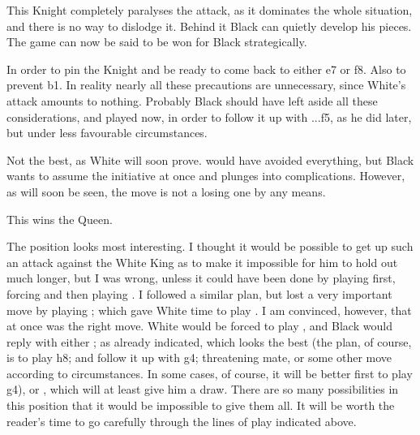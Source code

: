 \documentclass[10pt,twoside]{article}
\begin{document}

This Knight completely paralyses the attack, as it dominates the whole situation, and there is no way to dislodge it. Behind it Black can quietly develop his pieces. The game can now be said to be won for Black strategically.


In order to pin the Knight and be ready to come back to either e7 or f8. Also to prevent \figR b1. In reality nearly all these precautions are unnecessary, since White's attack amounts to nothing. Probably Black should have left aside all these considerations, and played  now, in order to follow it up with ...f5, as he did later, but under less favourable circumstances.


\board


Not the best, as White will soon prove.  would have avoided everything, but Black wants to assume the initiative at once and plunges into complications. However, as will soon be seen, the move is not a losing one by any means.


\board


This wins the Queen.


\board

The position looks most interesting. I thought it would be possible to get up such an attack against the White King as to make it impossible for him to hold out much longer, but I was wrong, unless it could have been done by playing  first, forcing  and then playing . I followed a similar plan, but lost a very important move by playing ; which gave White time to play . I am convinced, however, that  at once was the right move. White would be forced to play , and Black would reply with either ; as already indicated, which looks the best (the plan, of course, is to play \figR h8; and follow it up with \figK g4; threatening mate, or some other move according to circumstances. In some cases, of course, it will be better first to play \figK g4), or , which will at least give him a draw. There are so many possibilities in this position that it would be impossible to give them all. It will be worth the reader's time to go carefully through the lines of play indicated above.
\end{document}
